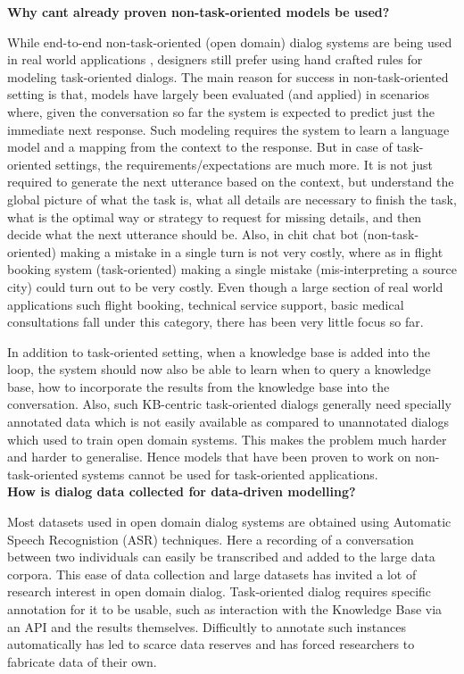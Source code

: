 \noindent \textbf{Why cant already proven non-task-oriented models be used?}

While end-to-end non-task-oriented (open domain) dialog systems are being used in real world applications \cite{smartreply}, designers still prefer using hand crafted rules for modeling task-oriented dialogs. The main reason for success in non-task-oriented setting is that, models have largely been evaluated (and applied) in scenarios where, given the conversation so far the system is expected to predict just the immediate next response. Such modeling requires the system to learn a language model and a mapping from the context to the response. But in case of task-oriented settings, the requirements/expectations are much more. It is not just required to generate the next utterance based on the context, but understand the global picture of what the task is, what all details are necessary to finish the task, what is the optimal way or strategy to request for missing details, and then decide what the next utterance should be. Also, in chit chat bot (non-task-oriented) making a mistake in a single turn is not very costly, where as in flight booking system (task-oriented) making a single mistake (mis-interpreting a source city) could turn out to be very costly. Even though a large section of real world applications such flight booking, technical service support, basic medical consultations fall under this category, there has been very little focus so far.

In addition to task-oriented setting, when a knowledge base is added into the loop, the system should now also be able to learn when to query a knowledge base, how to incorporate the results from the knowledge base into the conversation. Also, such KB-centric task-oriented dialogs generally need specially annotated data which is not easily available as compared to unannotated dialogs which used to train open domain systems. This makes the problem much harder and harder to generalise. Hence models that have been proven to work on non-task-oriented systems cannot be used for task-oriented applications.\\

\noindent \textbf{How is dialog data collected for data-driven modelling?}

Most datasets used in open domain dialog systems are obtained using Automatic Speech Recognistion (ASR) techniques. Here a recording of a conversation between two individuals can easily be transcribed and added to the large data corpora. This ease of data collection and large datasets has invited a lot of research interest in open domain dialog. Task-oriented dialog requires specific annotation for it to be usable, such as interaction with the Knowledge Base via an API and the results themselves. Difficultly to annotate such instances automatically has led to scarce data reserves and has forced researchers to fabricate data of their own.

